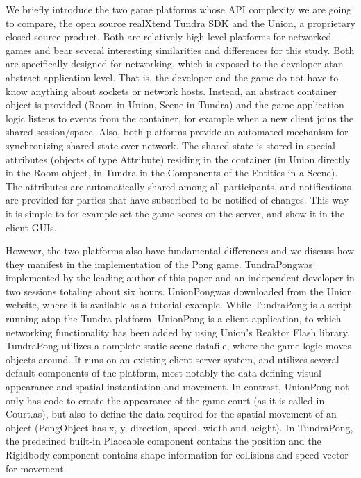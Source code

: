 \documentclass[conference]{IEEEtran}
\begin{document}
We briefly introduce the two game platforms whose API complexity we are
going to compare, the open source realXtend Tundra SDK
\cite{Alatalo2011} and the Union, a proprietary closed source
product\footnotemark[1]. Both are relatively high-level platforms for
networked games and bear several interesting similarities and
differences for this study. Both are specifically designed for
networking, which is exposed to the developer atan abstract
application level. That is, the developer and the game do not have to
know anything about sockets or network hosts. Instead, an abstract
container object is provided (Room in Union, Scene in Tundra) and the
game application logic listens to events from the container, for
example when a new client joins the shared session/space. Also, both
platforms provide an automated mechanism for synchronizing shared
state over network. The shared state is stored in special attributes
(objects of type Attribute) residing in the container (in Union
directly in the Room object, in Tundra in the Components of the
Entities in a Scene). The attributes are automatically shared among
all participants, and notifications are provided for parties that have
subscribed to be notified of changes. This way it is simple to for
example set the game scores on the server, and show it in the client
GUIs.


However, the two platforms also have fundamental differences and we
discuss how they manifest in the implementation of the Pong
game. TundraPong\footnotemark[2] was implemented by the leading author
of this paper and an independent developer in two sessions totaling
about six hours. UnionPong\footnotemark[3] was downloaded from the
Union website, where it is available as a tutorial example. While
TundraPong is a script running atop the Tundra platform, UnionPong is
a client application, to which networking functionality has been added
by using Union’s Reaktor Flash library. TundraPong utilizes a complete
static scene datafile, where the game logic moves objects around. It
runs on an existing client-server system, and utilizes several default
components of the platform, most notably the data defining visual
appearance and spatial instantiation and movement. In contrast,
UnionPong not only has code to create the appearance of the game court
(as it is called in Court.as), but also to define the data required for
the spatial movement of an object (PongObject has x, y, direction,
speed, width and height). In TundraPong, the predefined built-in
Placeable component contains the position and the Rigidbody component
contains shape information for collisions and speed vector for
movement.
\end{document}
